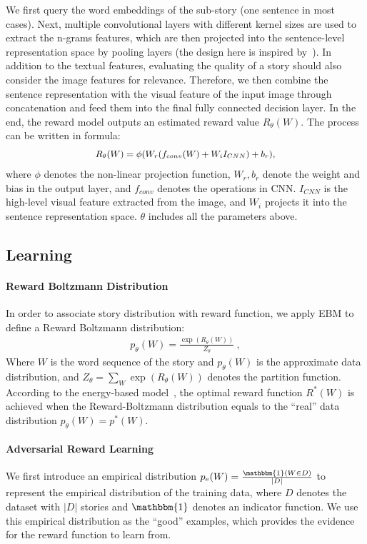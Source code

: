 \documentclass[11pt,a4paper]{article}
\begin{document}
We first query the word embeddings of the sub-story (one sentence in most cases). Next, multiple convolutional layers with different kernel sizes are used to extract the n-grams features, which are then projected into the sentence-level representation space by pooling layers (the design here is inspired by~\citet{kim2014convolutional}). In addition to the textual features, evaluating the quality of a story should also consider the image features for relevance. Therefore, we then combine the sentence representation with the visual feature of the input image through concatenation and feed them into the final fully connected decision layer. In the end, the reward model outputs an estimated reward value $R_{\theta}(W)$. The process can be written in formula:
\begin{align}
\small
\begin{split}
R_{\theta}(W) = \phi(W_r (f_{conv}(W) + W_i I_{CNN}) + b_r),
\end{split}
\end{align}
where $\phi$ denotes the non-linear projection function, $W_r, b_r$ denote the weight and bias in the output layer, and $f_{conv}$ denotes the operations in CNN. $I_{CNN}$ is the high-level visual feature extracted from the image, and $W_i$ projects it into the sentence representation space. $\theta$ includes all the parameters above.
\subsection{Learning}
\label{sec:learn}
\paragraph{Reward Boltzmann Distribution}
In order to associate story distribution with reward function, we apply EBM to define a Reward Boltzmann distribution:
\begin{align}
p_{\theta}(W) = \frac{\exp(R_{\theta}(W))}{Z_{\theta}} ~,
\end{align}
Where $W$ is the word sequence of the story and $p_{\theta}(W)$ is the approximate data distribution, and $Z_{\theta}=\underset{W}{\sum} \exp(R_{\theta}(W))$ denotes the partition function. According to the energy-based model~\cite{lecun2006tutorial}, the optimal reward function $R^*(W)$ is achieved when the Reward-Boltzmann distribution equals to the ``real'' data distribution $p_{\theta}(W) = p^*(W)$. 

\paragraph{Adversarial Reward Learning}
We first introduce an empirical distribution $p_e(W) = \frac{\mathbbm{1}(W \in D)}{|D|}$ to represent the empirical distribution of the training data, where $D$ denotes the dataset with $|D|$ stories and $\mathbbm{1}$ denotes an indicator function. We use this empirical distribution as the ``good'' examples, which provides the evidence for the reward function to learn from. 
\end{document}
